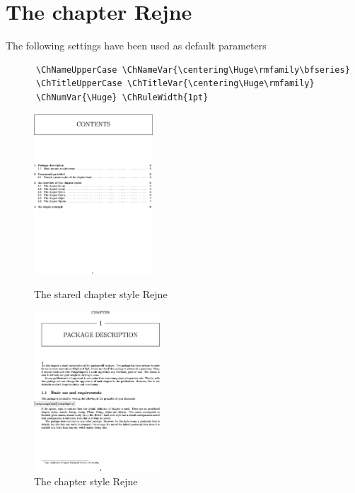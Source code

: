 \documentclass{report}
\begin{document}
    \section{The chapter Rejne}
    The following settings have been used as default parameters
    {\small\begin{verbatim}  
      \ChNameUpperCase \ChNameVar{\centering\Huge\rmfamily\bfseries}
      \ChTitleUpperCase \ChTitleVar{\centering\Huge\rmfamily}
      \ChNumVar{\Huge} \ChRuleWidth{1pt}
   \end{verbatim}}
    \begin{figure}[h]
      \begin{minipage}{7 cm}
        \centerline{\includegraphics[height=6cm]{Rejnes.eps}}
        \caption{The stared chapter style Rejne}
      \end{minipage}\hfill
      \begin{minipage}{7 cm}
        \centerline{\includegraphics[height=6cm]{Rejne.eps}}
        \caption{The chapter style Rejne}
      \end{minipage}\hfill
    \end{figure}
\end{document}
